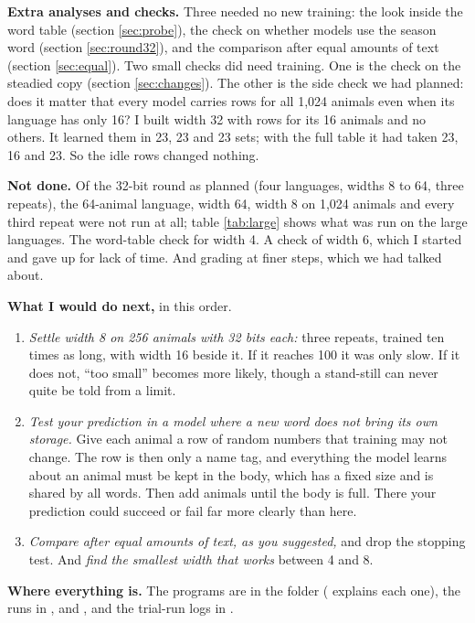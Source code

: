 \textbf{Extra analyses and checks.} Three needed no new training: the look inside the word
table (section \ref{sec:probe}), the check on whether models use the season word (section
\ref{sec:round32}), and the comparison after equal amounts of text (section \ref{sec:equal}). Two small checks did need training. One is the check on
the steadied copy (section \ref{sec:changes}). The other is the side check we had planned:
does it matter that every model carries rows for all 1,024 animals even when its language has
only 16? I built width 32 with rows for its 16 animals and no others. It learned them in 23, 23
and 23 sets; with the full table it had taken 23, 16 and 23. So the idle rows changed nothing.

\textbf{Not done.} Of the 32-bit round as planned (four languages, widths 8 to 64, three
repeats), the 64-animal language, width 64, width 8 on 1,024
animals and every third repeat were not run at all; table \ref{tab:large} shows what was run
on the large languages. The word-table check for width 4. A check of width 6, which I started
and gave up for lack of time. And grading at finer steps, which we had talked about.

\textbf{What I would do next,} in this order.
\begin{enumerate}
\item \emph{Settle width 8 on 256 animals with 32 bits each:} three repeats, trained ten times
      as long, with width 16 beside it. If it reaches 100 it was only slow. If it does not, ``too
      small'' becomes more likely, though a stand-still can never quite be told from a limit.
\item \emph{Test your prediction in a model where a new word does not bring its own storage.}
      Give each animal a row of random numbers that training may not change. The row is then
      only a name tag, and everything the model learns about an animal must be kept in the
      body, which has a fixed size and is shared by all words. Then add animals until the body
      is full. There your prediction could succeed or fail far more clearly than here.
\item \emph{Compare after equal amounts of text, as you suggested,} and drop the stopping test.
      And \emph{find the smallest width that works} between 4 and 8.
\end{enumerate}

\textbf{Where everything is.} The programs are in the folder  ( explains
each one), the runs in ,  and , and the
trial-run logs in .
